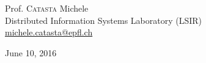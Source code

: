 \documentclass[a4paper,11pt,twoside]{article}
\newenvironment{bottompar}{\par\vspace*{\fill}}{\clearpage}
\newcommand{\mail}[1]{{\href{mailto:#1}{#1}}}
\begin{document}
\begin{titlepage}
\begin{center}
\begin{bottompar}
\begin{flushleft} \large
Prof. \textsc{Catasta} Michele\\
Distributed Information Systems Laboratory (LSIR) \\
\mail{michele.catasta@epfl.ch} \\ 
\end{flushleft}

{\large June 10, 2016}\\[1cm] %

\end{bottompar}
 

%
%
%
%
%
%






\end{center}
\end{titlepage}
\end{document}
